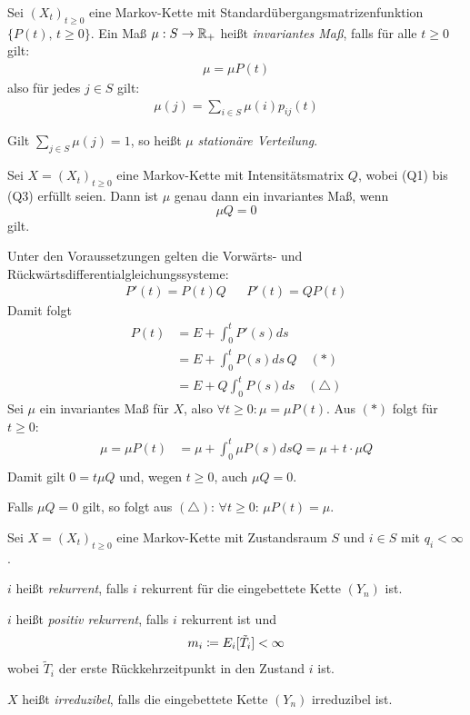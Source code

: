 \documentclass[a4paper,twoside,DIV15,BCOR12mm]{scrbook}
\begin{document}
\begin{definition}
Sei $(X_t)_{t\ge 0}$ eine Markov-Kette mit Standardübergangsmatrizenfunktion $\{P(t),\, t\ge 0\}$. Ein Maß $\mu:S\to \mathbb{R}_+$ heißt \emph{invariantes Maß}, falls für alle $t\ge 0$ gilt:
\begin{align*}
\mu = \mu P(t)
\end{align*}
also für jedes $j\in S$ gilt:
\begin{align*}
\mu(j) = \sum_{i\in S} \mu(i) p_{ij}(t)
\end{align*}

Gilt $\sum_{j\in S}\mu(j)=1$, so heißt $\mu$ \emph{stationäre Verteilung}.
\end{definition}

\begin{satz}
Sei $X=(X_t)_{t\ge 0}$ eine Markov-Kette mit Intensitätsmatrix $Q$, wobei (Q1) bis (Q3) erfüllt seien. Dann ist $\mu$ genau dann ein invariantes Maß, wenn
\[
\mu Q = 0
\]
gilt.
\end{satz}

\begin{beweis}
Unter den Voraussetzungen gelten die Vorwärts- und Rückwärtsdifferentialgleichungssysteme:
\begin{align*}
P'(t) = P(t) Q && P'(t)=QP(t)
\end{align*}
Damit folgt 
\begin{align*}
P(t) &= E + \int_{0}^t P'(s) ds \\
&= E + \int_0^t P(s)ds\, Q\quad(*)\\
&= E + Q\int_0^t P(s)ds\quad(\triangle)
\end{align*}
Sei $\mu$ ein invariantes Maß für $X$, also $\forall t\ge 0:\mu=\mu P(t)$. Aus $(*)$ folgt für $t\ge0$:
\begin{align*}
\mu = \mu P(t) &= \mu + \int_0^t\mu P(s) ds Q = \mu + t\cdot\mu Q\\
\end{align*}
Damit gilt $0 = t\mu Q$ und, wegen $t\ge 0$, auch $\mu Q = 0$.

Falls $\mu Q =0$ gilt, so folgt aus $(\triangle)$: $\forall t\ge 0$: $\mu P(t) = \mu$.
\end{beweis}

\begin{definition}
Sei $X=(X_t)_{t\ge0}$ eine Markov-Kette mit Zustandsraum $S$ und $i\in S$ mit $q_i<\infty$.
\begin{enuma}
\item $i$ heißt \emph{rekurrent}, falls $i$ rekurrent für die eingebettete Kette $(Y_n)$ ist.
\item $i$ heißt \emph{positiv rekurrent}, falls $i$ rekurrent ist und
\begin{align*}
m_i \da E_i[\tilde T_i]<\infty
\end{align*}
wobei $\tilde T_i$ der erste Rückkehrzeitpunkt in den Zustand $i$ ist.
\item $X$ heißt \emph{irreduzibel}, falls die eingebettete Kette $(Y_n)$ irreduzibel ist.
\end{enuma}
\end{definition}
\end{document}
